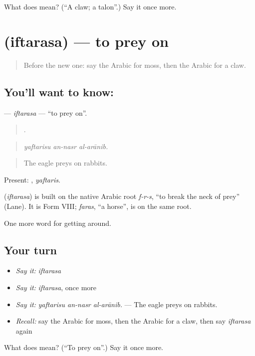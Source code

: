 \begin{tcolorbox}[breakable,colback=teal!4,colframe=teal!35!black,title={Before you move on}]
What does  mean? (\textquotedblleft{}A claw; a talon\textquotedblright{}.) Say it once more.
\end{tcolorbox}
\section[\texorpdfstring{\ar{افترس} (iftarasa)}{افترس (iftarasa)}]{ (iftarasa) — to prey on}

\label{lesson:AR-C476-iftarasa}



\begin{quote}
Before the new one: say the Arabic for moss, then the Arabic for a claw.
\end{quote}

\subsection*{You'll want to know: }
\textbf{} — \emph{iftarasa} — \textquotedblleft{}to prey on\textquotedblright{}.

\begin{quote}
  .
\end{quote}

\begin{quote}
\emph{yaftarisu an-nasr al-arānib.}
\end{quote}

\begin{quote}
The eagle preys on rabbits.
\end{quote}

Present: , \emph{yaftaris}.

\begin{cousinweb}
\textbf{} (\emph{iftarasa}) is built on the native Arabic root \emph{f-r-s}, \textquotedblleft{}to break the neck of prey\textquotedblright{} (Lane). It is Form VIII; \emph{faras}, \textquotedblleft{}a horse\textquotedblright{}, is on the same root.
\end{cousinweb}

\begin{grammarlens}[title={What you've built}]
One more word for getting around.
\end{grammarlens}

\subsection*{Your turn}
\begin{itemize}
\raggedright
  \item \emph{Say it:} \emph{iftarasa}
  \item \emph{Say it:} \emph{iftarasa}, once more
  \item \emph{Say it:} \emph{yaftarisu an-nasr al-arānib.} — The eagle preys on rabbits.
  \item \emph{Recall:} say the Arabic for moss, then the Arabic for a claw, then say \emph{iftarasa} again
\end{itemize}

\begin{tcolorbox}[breakable,colback=teal!4,colframe=teal!35!black,title={Before you move on}]
What does  mean? (\textquotedblleft{}To prey on\textquotedblright{}.) Say it once more.
\end{tcolorbox}
